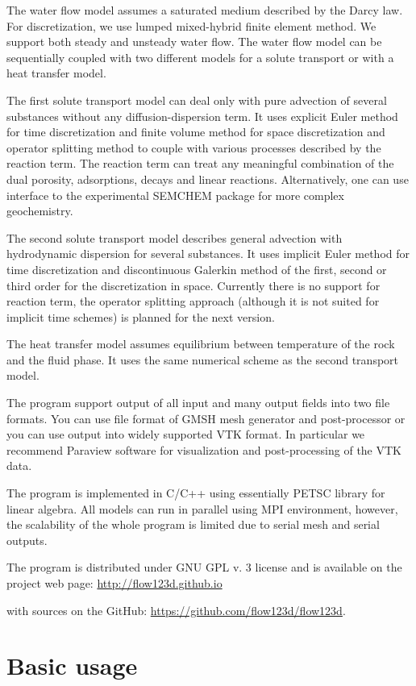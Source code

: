 \documentclass[12pt,a4paper]{report}
\begin{document}
The water flow model assumes a saturated medium described by the Darcy law. For discretization, we use lumped mixed-hybrid finite element method.
We support both steady and unsteady water flow. The water flow model can be sequentially coupled with two different models for a solute transport or with a heat transfer model.

The first solute transport model can deal only with pure advection of several substances without any diffusion-dispersion term. It uses 
explicit Euler method for time discretization and finite volume method for space discretization and operator splitting method to 
couple with various processes described by the reaction term. The reaction term can treat any meaningful combination of the dual porosity, adsorptions, decays and linear reactions.
Alternatively, one can use interface to the experimental SEMCHEM package for more complex geochemistry.

The second solute transport model describes general advection with hydrodynamic dispersion for several substances. It uses implicit Euler method for time discretization and discontinuous Galerkin method of
the first, second or third order for the discretization in space. Currently there is no support for reaction term, the operator splitting approach (although it is not suited for implicit time schemes) 
is planned for the next version.

The heat transfer model assumes equilibrium between temperature of the rock and the fluid phase. It uses the same numerical scheme as the second transport model.

The program support output of all input and many output fields into two file formats. You can use file format of GMSH mesh generator and post-processor 
or you can use output into widely supported VTK format. In particular we recommend Paraview software for visualization and post-processing of the VTK data.

The program is implemented in C/C++ using essentially PETSC library for linear algebra. All models can run in parallel using MPI environment, however, 
the scalability of the whole program is limited due to serial mesh and serial outputs.


The program is distributed under GNU GPL v. 3 license and is available on the project web page:
\url{http://flow123d.github.io}

with sources on the GitHub:
\url{https://github.com/flow123d/flow123d}.

\section{Basic usage}
\end{document}
